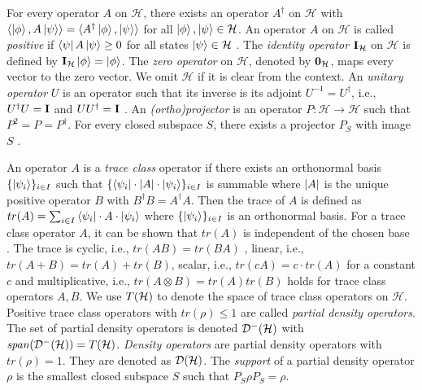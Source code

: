 \documentclass[a4paper,UKenglish,cleveref, autoref, thm-restate]{lipics-v2021}
\begin{document}
For every operator $A$ on $\mathcal{H}$, there exists an operator $A^\dagger$ on $\mathcal{H}$ with $\langle\ket{\phi}, A\ket{\psi}\rangle=\langle A^\dagger\ket{\phi},\ket{\psi}\rangle$ for all $\ket{\phi},\ket{\psi}\in \mathcal{H}$.
An operator $A$ on $\mathcal{H}$ is called \emph{positive} if $\bra{\psi}A\ket{\psi}\geq 0$ for all states $\ket{\psi}\in \mathcal{H}$ \cite{Nielsen_Chuang_2010}.
The \emph{identity operator} $\textbf{I}_{\mathcal{H}}$ on $\mathcal{H}$ is defined by $\textbf{I}_{\mathcal{H}} \ket{\phi}=\ket{\phi}$. The \emph{zero operator} on $\mathcal{H}$, denoted by $\mathbf{0}_{\mathcal{H}}$, maps every vector to the zero vector. We omit $\mathcal{H}$ if it is clear from the context.
An \textit{unitary operator} $U$ is an operator such that its inverse is its adjoint $U^{-1}=U^{\dagger}$, i.e., $U^\dagger U = \textbf{I}$ and $U U^\dagger = \textbf{I}$ \cite{verificationSummary}.
An \emph{(ortho)projector} is an operator $P: \mathcal{H} \to \mathcal{H}$ such that $P^2 = P=P^\dagger$. For every closed subspace $S$, there exists a projector $P_S$ with image $S$ \cite[Prop. II.3.2 (b)]{conway1994}.

An operator $A$ is a \emph{trace class} operator if there exists an orthonormal basis $\{\ket{\psi_i}\}_{i \in I}$ such that $\{\bra{\psi_i} \cdot \abs{A} \cdot \ket{\psi_i} \}_{i \in I}$ is summable where $\abs{A}$ is the unique positive operator $B$ with $B^\dagger B = A^\dagger A$. Then the trace of $A$ is defined as $tr(A) = \sum_{i \in I} \bra{\psi_i} \cdot A \cdot  \ket{\psi_i}$
where $\{\ket{\psi_i}\}_{i \in I}$ is an orthonormal basis. For a trace class operator $A$, it can be shown that $tr(A)$ is independent of the chosen base \cite{floydHoareLogic}. The trace is cyclic, i.e., $tr(AB)=tr(BA)$ \cite{heisenbergdualityUnruh}, linear, i.e., $tr(A+B) = tr(A) + tr(B)$, scalar, i.e., $tr(cA) = c\cdot tr(A)$ for a constant $c$ \cite{conway2000courseOperator} and multiplicative, i.e., $tr(A \otimes B)= tr(A)tr(B)$ holds \cite{heisenbergdualityUnruh} for trace class operators $A,B$.
We use $T(\mathcal{H})$ to denote the space of trace class operators on $\mathcal{H}$.
Positive trace class operators with $tr(\rho)\leq 1$ are called \textit{partial density operators}. The set of partial density operators is denoted $\mathcal{D}^- (\mathcal{H})$ with $\mathit{span}(\mathcal{D}^- (\mathcal{H}))=T(\mathcal{H})$.
\textit{Density operators} are partial density operators with $tr(\rho) = 1$. They are denoted as $\mathcal{D}(\mathcal{H})$. The \emph{support} of a partial density operator $\rho$ is the smallest closed subspace $S$ such that $P_S \rho P_S = \rho$.
\end{document}
